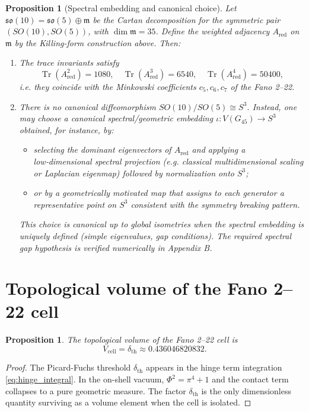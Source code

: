 \documentclass[12pt]{article}
\newtheorem{proposition}[theorem]{Proposition}
\numberwithin{equation}{section}
\newcommand{\dth}{\delta_{\mathrm{th}}}
\begin{document}
\begin{proposition}[Spectral embedding and canonical choice]
\label{prop:natural_embedding_fixed}
Let \(\mathfrak{so}(10)=\mathfrak{so}(5)\oplus\mathfrak{m}\) be the Cartan decomposition for the symmetric pair \((SO(10),SO(5))\), with \(\dim\mathfrak{m}=35\).
Define the weighted adjacency \(A_{\mathrm{red}}\) on \(\mathfrak{m}\) by the Killing-form construction above.
Then:
\begin{enumerate}
  \item The trace invariants satisfy
  \[
  \operatorname{Tr}(A_{\mathrm{red}}^2)=1080,\quad
  \operatorname{Tr}(A_{\mathrm{red}}^3)=6540,\quad
  \operatorname{Tr}(A_{\mathrm{red}}^4)=50400,
  \]
  i.e. they coincide with the Minkowski coefficients \(c_5,c_6,c_7\) of the Fano 2--22.
  \item There is no canonical diffeomorphism \(SO(10)/SO(5)\cong S^3\). Instead, one may choose a canonical \emph{spectral/geometric embedding}
  \(\iota:V(G_{45})\to S^3\) obtained, for instance, by:
  \begin{itemize}
    \item selecting the dominant eigenvectors of \(A_{\mathrm{red}}\) and applying a low‑dimensional spectral projection (e.g. classical multidimensional scaling or Laplacian eigenmap) followed by normalization onto \(S^3\);
    \item or by a geometrically motivated map that assigns to each generator a representative point on \(S^3\) consistent with the symmetry breaking pattern.
  \end{itemize}
  This choice is canonical up to global isometries when the spectral embedding is uniquely defined (simple eigenvalues, gap conditions). The required spectral gap hypothesis is verified numerically in Appendix B.
\end{enumerate}
\end{proposition}

\section{Topological volume of the Fano 2--22 cell}

\begin{proposition}
The topological volume of the Fano 2--22 cell is
\[
\boxed{V_{\text{cell}} = \dth \approx 0.436046820832}. \tag{23}
\]
\end{proposition}
\begin{proof}
The Picard-Fuchs threshold \(\dth\) appears in the hinge term integration \eqref{eq:hinge_integral}. In the on-shell vacuum, \(\Phi^2 = \pi^4 + 1\) and the contact term collapses to a pure geometric measure. The factor \(\dth\) is the only dimensionless quantity surviving as a volume element when the cell is isolated.
\end{proof}
\end{document}
